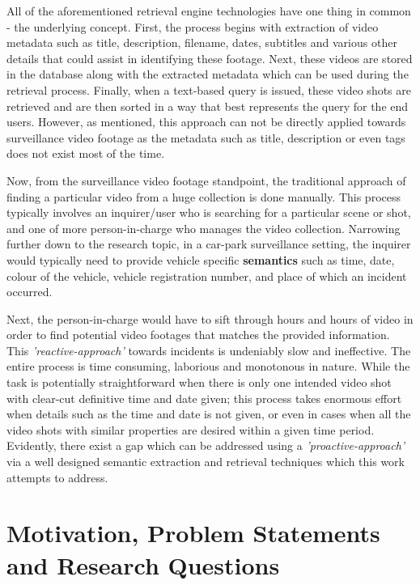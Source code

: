 All of the aforementioned retrieval engine technologies have one thing in common - the underlying concept. First, the process begins with extraction of video metadata such as title, description, filename, dates, subtitles and various other details that could assist in identifying these footage. Next, these videos are stored in the database along with the extracted metadata which can be used during the retrieval process. Finally, when a text-based query is issued, these video shots are retrieved and are then sorted in a way that best represents the query for the end users.
However, as mentioned, this approach can not be directly applied towards surveillance video footage as the metadata such as title, description or even tags does not exist most of the time.

Now, from the surveillance video footage standpoint, the traditional approach of finding a particular video from a huge collection is done manually. This process typically involves an inquirer/user who is searching for a particular scene or shot, and one of more person-in-charge who manages the video collection. Narrowing further down to the research topic, in a car-park surveillance setting, the inquirer would typically need to provide vehicle specific \textbf{semantics} such as time, date, colour of the vehicle, vehicle registration number, and place of which an incident occurred. %

Next, the person-in-charge would have to sift through hours and hours of video in order to find potential video footages that matches the provided information. This \textit{'reactive-approach'} towards incidents is undeniably slow and ineffective. The entire process is time consuming, laborious and monotonous in nature. While the task is potentially straightforward when there is only one intended video shot with clear-cut definitive time and date given; this process takes enormous effort when details such as the time and date is not given, or even in cases when all the video shots with similar properties are desired within a given time period. Evidently, there exist a gap which can be addressed using a \textit{'proactive-approach'} via a well designed semantic extraction and retrieval techniques which this work attempts to address.

\section{Motivation, Problem Statements and Research Questions}

